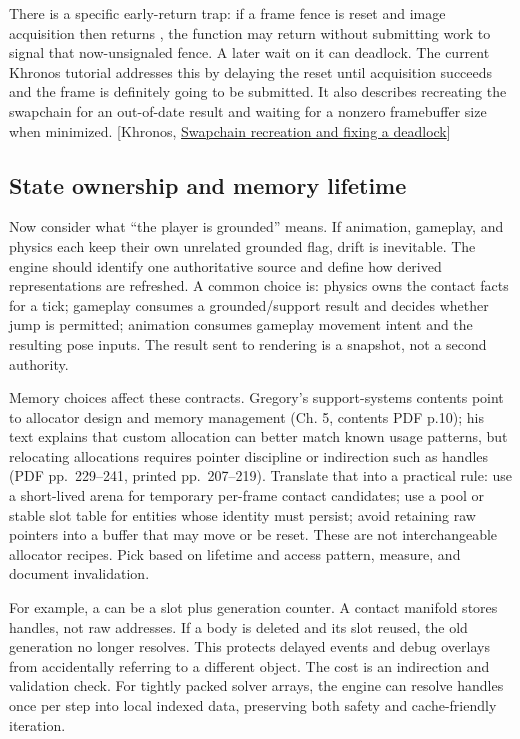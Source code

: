 There is a specific early-return trap: if a frame fence is reset and image acquisition then returns , the function may return without submitting work to signal that now-unsignaled fence. A later wait on it can deadlock. The current Khronos tutorial addresses this by delaying the reset until acquisition succeeds and the frame is definitely going to be submitted. It also describes recreating the swapchain for an out-of-date result and waiting for a nonzero framebuffer size when minimized. {[}Khronos, \href{https://docs.vulkan.org/tutorial/latest/03_Drawing_a_triangle/04_Swap_chain_recreation.html}{Swapchain recreation and fixing a deadlock}{]}

\subsection{State ownership and memory lifetime}\label{05-engine-i-ch014-state-ownership-and-memory-lifetime}

\hypertarget{05-engine-i-ch014-state-ownership-and-memory-lifetime}{}

Now consider what ``the player is grounded'' means. If animation, gameplay, and physics each keep their own unrelated grounded flag, drift is inevitable. The engine should identify one authoritative source and define how derived representations are refreshed. A common choice is: physics owns the contact facts for a tick; gameplay consumes a grounded/support result and decides whether jump is permitted; animation consumes gameplay movement intent and the resulting pose inputs. The result sent to rendering is a snapshot, not a second authority.

Memory choices affect these contracts. Gregory's support-systems contents point to allocator design and memory management (Ch. 5, contents PDF p.10); his text explains that custom allocation can better match known usage patterns, but relocating allocations requires pointer discipline or indirection such as handles (PDF pp.~229--241, printed pp.~207--219). Translate that into a practical rule: use a short-lived arena for temporary per-frame contact candidates; use a pool or stable slot table for entities whose identity must persist; avoid retaining raw pointers into a buffer that may move or be reset. These are not interchangeable allocator recipes. Pick based on lifetime and access pattern, measure, and document invalidation.

For example, a  can be a slot plus generation counter. A contact manifold stores handles, not raw addresses. If a body is deleted and its slot reused, the old generation no longer resolves. This protects delayed events and debug overlays from accidentally referring to a different object. The cost is an indirection and validation check. For tightly packed solver arrays, the engine can resolve handles once per step into local indexed data, preserving both safety and cache-friendly iteration.

